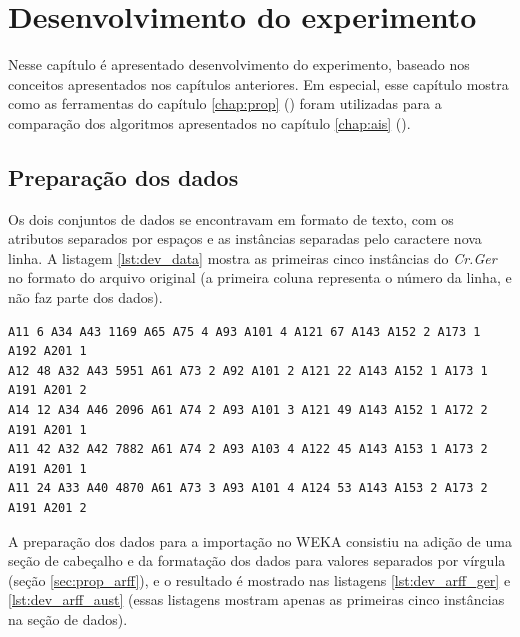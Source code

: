 \chapter{Desenvolvimento do experimento}

Nesse capítulo é apresentado desenvolvimento do experimento, baseado nos conceitos apresentados nos capítulos anteriores. Em especial, esse capítulo mostra como as ferramentas do capítulo \ref{chap:prop} () foram utilizadas para a comparação dos algoritmos apresentados no capítulo \ref{chap:ais} ().

\section{Preparação dos dados}

Os dois conjuntos de dados se encontravam em formato de texto, com os atributos separados por espaços e as instâncias separadas pelo caractere nova linha. A listagem \ref{lst:dev_data} mostra as primeiras cinco instâncias do \emph{Cr.Ger} no formato do arquivo original (a primeira coluna representa o número da linha, e não faz parte dos dados).

\vspace{0.5cm}
\begin{lstlisting}[caption=Formato original dos dados (\emph{Cr.Ger}), label=lst:dev_data]
A11 6 A34 A43 1169 A65 A75 4 A93 A101 4 A121 67 A143 A152 2 A173 1 A192 A201 1
A12 48 A32 A43 5951 A61 A73 2 A92 A101 2 A121 22 A143 A152 1 A173 1 A191 A201 2
A14 12 A34 A46 2096 A61 A74 2 A93 A101 3 A121 49 A143 A152 1 A172 2 A191 A201 1
A11 42 A32 A42 7882 A61 A74 2 A93 A103 4 A122 45 A143 A153 1 A173 2 A191 A201 1
A11 24 A33 A40 4870 A61 A73 3 A93 A101 4 A124 53 A143 A153 2 A173 2 A191 A201 2
\end{lstlisting}
\vspace{0.5cm}

A preparação dos dados para a importação no WEKA consistiu na adição de uma seção de cabeçalho e da formatação dos dados para valores separados por vírgula (seção \ref{sec:prop_arff}), e o resultado é mostrado nas listagens \ref{lst:dev_arff_ger} e \ref{lst:dev_arff_aust} (essas listagens mostram apenas as primeiras cinco instâncias na seção de dados).

